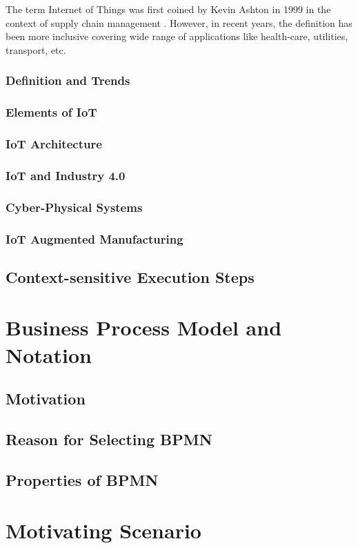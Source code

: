 The term Internet of Things was first coined by Kevin Ashton in 1999 in the context of supply chain management \cite{IOTFIRST}. However, in recent years, the definition has been more inclusive covering wide range of applications like health-care, utilities, transport, etc.
\subsection{Definition and Trends}
\subsection{Elements of IoT}
\subsection{IoT Architecture}
\subsection{IoT and Industry 4.0}
\subsection{Cyber-Physical Systems} \label{CPS}
\subsection{IoT Augmented Manufacturing}
\section{Context-sensitive Execution Steps}\label{conces}

\chapter{Business Process Model and Notation} \label{chap:bpmn}
\section{Motivation}
\section{Reason for Selecting BPMN}
\section{Properties of BPMN}
\chapter{Motivating Scenario} \label{chap:motscene}